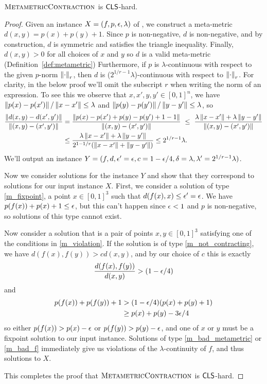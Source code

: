 \begin{theorem}
\label{thm:MMCMisCLShard}
  $\textsc{MetametricContraction}$ is $\mathsf{CLS}$-hard.
\end{theorem}
\begin{proof}
  Given an instance $X = (f,p,\epsilon,\lambda)$ of \CLO, we construct a meta-metric $d(x,y) = p(x) + p(y) + 1$. 
	Since $p$ is non-negative, $d$ is non-negative, and by construction, $d$ is symmetric and satisfies the triangle inequality. Finally, $d(x,y) > 0$ for all choices of $x$ and $y$ so $d$ is a valid meta-metric (Definition~\ref{def:metametric}) Furthermore, if $p$ is $\lambda$-continuous with respect to the given $p$-norm $\left\| \cdot \right\|_r$, then $d$ is ($2^{1/r-1}\lambda$)-continuous with respect to $\left\| \cdot \right\|_r$. For clarity, in the below proof we'll omit the subscript $r$ when writing the norm of an expression. To see this we observe that $x,x',y,y'\in [0,1]^n$, we have $\left\| p(x)-p(x') \right\|/\left\| x-x' \right\| \leq \lambda$ and $\left\| p(y) - p(y') \right\|/\left\| y-y' \right\| \leq \lambda$, so
  \begin{align*}
    \frac{\left\| d(x,y) - d(x',y') \right\|}{\left\| (x,y) - (x',y') \right\|}
    &= \frac{\left\| p(x) - p(x') + p(y) - p(y') + 1 - 1 \right\|}{\left\| (x,y) -(x',y') \right\|}\ \leq\ \frac{\lambda\left\| x-x' \right\| + \lambda\left\| y-y' \right\|}{\left\| (x,y) -(x',y') \right\|}\\
    &\leq \frac{\lambda\left\| x-x' \right\| + \lambda\left\| y-y' \right\|}{2^{1-1/r}(\left\| x-x' \right\| + \left\| y-y' \right\|)} \leq 2^{1/r-1}\lambda \text{.}
  \end{align*}
We'll output an instance $Y = (f,d,\epsilon'=\epsilon,c = 1-\epsilon/4,\delta=\lambda, \lambda'=2^{1/r-1}\lambda)$.

Now we consider solutions for the instance $Y$ and show that they correspond to solutions for our input instance $X$.
%
First, we consider a solution of type \ref{m_fixpoint}, a point $x\in [0,1]^3$ such that $d(f(x),x) \leq \epsilon'=\epsilon$. We have $p(f(x)) + p(x) + 1 \leq \epsilon$, but this can't happen since $\epsilon < 1$ and $p$ is non-negative, so solutions of this type cannot exist.

Now consider a solution that is a pair of points $x,y\in [0,1]^3$ satisfying one of the conditions in \ref{m_violation}. If the solution is of type \ref{m_not_contracting}, we have $d(f(x),f(y)) > c d(x,y)$, and by our choice of $c$ this is exactly
\[\frac{d(f(x),f(y))}{d(x,y)} > (1-\epsilon/4)\] and
\begin{align*}
  p(f(x)) + p(f(y)) + 1 &> (1-\epsilon/4) (p(x) + p(y) + 1)\\
                        &\geq p(x) + p(y) - 3\epsilon/4
\end{align*}
so either $p(f(x)) > p(x) - \epsilon$ or $p(f(y)) > p(y) - \epsilon$, and one of $x$ or $y$ must be a fixpoint solution to our input instance.
%
Solutions of type \ref{m_bad_metametric} or \ref{m_bad_f} immediately give us violations of the $\lambda$-continuity of $f$, and thus solutions to $X$.

This completes the proof that $\textsc{MetametricContraction}$ is $\mathsf{CLS}$-hard.
\end{proof}

